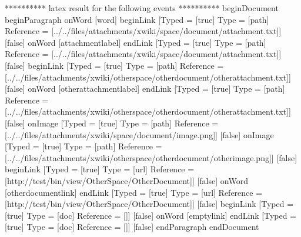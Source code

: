 ********** latex result for the following events **********
beginDocument
beginParagraph
onWord [word]
beginLink [Typed = [true] Type = [path] Reference = [../../files/attachments/xwiki/space/document/attachment.txt]] [false]
onWord [attachmentlabel]
endLink [Typed = [true] Type = [path] Reference = [../../files/attachments/xwiki/space/document/attachment.txt]] [false]
beginLink [Typed = [true] Type = [path] Reference = [../../files/attachments/xwiki/otherspace/otherdocument/otherattachment.txt]] [false]
onWord [otherattachmentlabel]
endLink [Typed = [true] Type = [path] Reference = [../../files/attachments/xwiki/otherspace/otherdocument/otherattachment.txt]] [false]
onImage [Typed = [true] Type = [path] Reference = [../../files/attachments/xwiki/space/document/image.png]] [false]
onImage [Typed = [true] Type = [path] Reference = [../../files/attachments/xwiki/otherspace/otherdocument/otherimage.png]] [false]
beginLink [Typed = [true] Type = [url] Reference = [http://test/bin/view/OtherSpace/OtherDocument]] [false]
onWord [otherdocumentlink]
endLink [Typed = [true] Type = [url] Reference = [http://test/bin/view/OtherSpace/OtherDocument]] [false]
beginLink [Typed = [true] Type = [doc] Reference = []] [false]
onWord [emptylink]
endLink [Typed = [true] Type = [doc] Reference = []] [false]
endParagraph
endDocument